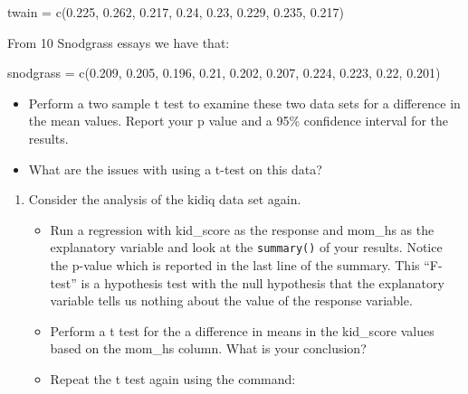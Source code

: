 \documentclass[
]{book}
\newenvironment{Shaded}{\begin{snugshade}}{\end{snugshade}}
\newcommand{\FloatTok}[1]{\textcolor[rgb]{0.00,0.00,0.81}{#1}}
\newcommand{\FunctionTok}[1]{\textcolor[rgb]{0.00,0.00,0.00}{#1}}
\newcommand{\NormalTok}[1]{#1}
\newcommand{\OtherTok}[1]{\textcolor[rgb]{0.56,0.35,0.01}{#1}}
\providecommand{\tightlist}{%
  \setlength{\itemsep}{0pt}\setlength{\parskip}{0pt}}
\theoremstyle{definition}
\theoremstyle{definition}
\theoremstyle{definition}
\theoremstyle{definition}
\theoremstyle{remark}
\begin{document}
\begin{Shaded}
\begin{Highlighting}[]
\NormalTok{twain }\OtherTok{=} \FunctionTok{c}\NormalTok{(}\FloatTok{0.225}\NormalTok{, }\FloatTok{0.262}\NormalTok{, }\FloatTok{0.217}\NormalTok{, }\FloatTok{0.24}\NormalTok{, }\FloatTok{0.23}\NormalTok{, }\FloatTok{0.229}\NormalTok{, }\FloatTok{0.235}\NormalTok{, }\FloatTok{0.217}\NormalTok{)}
\end{Highlighting}
\end{Shaded}

From 10 Snodgrass essays we have that:

\begin{Shaded}
\begin{Highlighting}[]
\NormalTok{snodgrass }\OtherTok{=} \FunctionTok{c}\NormalTok{(}\FloatTok{0.209}\NormalTok{, }\FloatTok{0.205}\NormalTok{, }\FloatTok{0.196}\NormalTok{, }\FloatTok{0.21}\NormalTok{, }\FloatTok{0.202}\NormalTok{, }\FloatTok{0.207}\NormalTok{, }\FloatTok{0.224}\NormalTok{, }\FloatTok{0.223}\NormalTok{, }\FloatTok{0.22}\NormalTok{, }\FloatTok{0.201}\NormalTok{)}
\end{Highlighting}
\end{Shaded}

\begin{itemize}
\tightlist
\item
  Perform a two sample t test to examine these two data sets for a difference in the mean values. Report your p value and a 95\% confidence interval for the results.
\item
  What are the issues with using a t-test on this data?
\end{itemize}

\begin{enumerate}
\def\labelenumi{\arabic{enumi}.}
\setcounter{enumi}{6}
\item
  Consider the analysis of the kidiq data set again.

  \begin{itemize}
  \tightlist
  \item
    Run a regression with kid\_score as the response and mom\_hs as the explanatory variable and look at the \texttt{summary()} of your results. Notice the p-value which is reported in the last line of the summary. This ``F-test'' is a hypothesis test with the null hypothesis that the explanatory variable tells us nothing about the value of the response variable.
  \item
    Perform a t test for the a difference in means in the kid\_score values based on the mom\_hs column. What is your conclusion?
  \item
    Repeat the t test again using the command:
  \end{itemize}
\end{enumerate}
\end{document}
